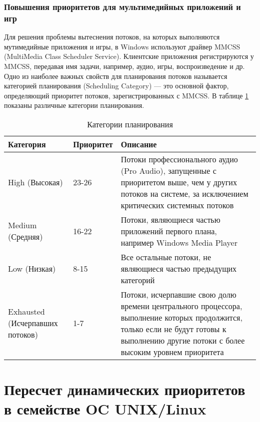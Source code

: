 \subsubsection*{Повышения приоритетов для мультимедийных приложений и игр}

Для решения проблемы вытеснения потоков, на которых выполняются мутимедийные приложения и игры, в Windows используют драйвер MMCSS (MultiMedia Class Scheduler Service). 
Клиентские приложения регистрируются у MMCSS, передавая имя задачи, например, аудио, игры, воспроизведение и др.  
Одно из наиболее важных свойств для планирования потоков называется категорией планирования (Scheduling Category) --- это основной фактор, определяющий приоритет потоков, зарегистрированных с MMCSS.
В таблице \ref{tbl:plan} показаны различные категории планирования.


\begin{table}[ht]
	\centering
	\begin{threeparttable}
		\caption{Категории планирования}
		\label{tbl:plan}
		\begin{tabularx}{\textwidth}{|X|X|p{80mm}|}
			\hline
			\bfseries Категория & \bfseries Приоритет & \bfseries Описание \\
			\hline
			High (Высокая) & 23-26 & Потоки профессионального аудио (Pro Audio), запущенные с приоритетом выше, чем у других потоков на системе, за исключением критических системных потоков \\
			\hline
			Medium (Средняя) & 16-22 & Потоки, являющиеся частью приложений первого плана, например Windows Media Player \\
			\hline
			Low (Низкая) & 8-15 & Все остальные потоки, не являющиеся частью предыдущих категорий \\
			\hline
			Exhausted (Исчерпавших потоков) & 1-7 & Потоки, исчерпавшие свою долю времени центрального процессора, выполнение которых продолжится, только если не будут готовы к выполнению другие потоки с более высоким уровнем приоритета \\
			\hline
		\end{tabularx}
	\end{threeparttable}
\end{table}

\clearpage

\section{Пересчет динамических приоритетов в семействе OC UNIX/Linux}

